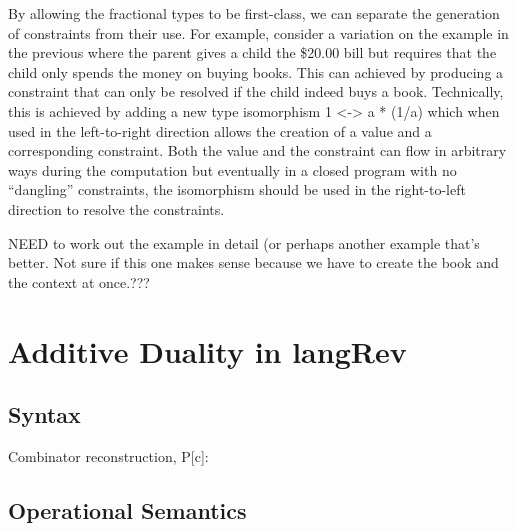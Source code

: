 \documentclass[preprint]{sigplanconf}
\begin{document}
By allowing the fractional types to be first-class, we can separate the
generation of constraints from their use. For example, consider a variation
on the example in the previous where the parent gives a child the \$20.00
bill but requires that the child only spends the money on buying books. This
can achieved by producing a constraint that can only be resolved if the child
indeed buys a book. Technically, this is achieved by adding a new type
isomorphism {{ 1 <-> a * (1/a) }} which when used in the left-to-right
direction allows the creation of a value and a corresponding constraint. Both
the value and the constraint can flow in arbitrary ways during the
computation but eventually in a closed program with no ``dangling''
constraints, the isomorphism should be used in the right-to-left direction to
resolve the constraints.

NEED to work out the example in detail (or perhaps another example that's
better. Not sure if this one makes sense because we have to create the book
and the context at once.???

\section{Additive Duality in {{langRev}} }

\subsection{Syntax}

%
%
%

Combinator reconstruction, {{P[c]}}:

\subsection{Operational Semantics}
\end{document}
